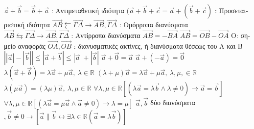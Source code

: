 \documentclass[12pt]{article}
\begin{document}
\begin{flushleft}
	\textbullet \quad $\vec{a} + \vec{b} = \vec{b} + \vec{a} $  :  \textgreek{Αντιμεταθετική ιδιότητα} \linebreak 
	\textbullet \quad $(\vec{a} + \vec{b} + \vec{c} = \vec{a} + (\vec{b} + \vec{c}) $  :  \textgreek{Προσεταιριστική ιδιότητα} \linebreak 
	\textbullet \quad $ \vec{AB} \leftleftarrows \vec{\Gamma \Delta} \rightarrow \vec{AB}, \vec{\Gamma \Delta} $  :  \textgreek{Ομόρροπα διανύσματα} \linebreak  
		\textbullet \quad $ \vec{AB} \leftrightarrows \vec{\Gamma \Delta} \rightarrow \vec{AB}, \vec{\Gamma \Delta} $  :  \textgreek{Αντίρροπα διανύσματα} \linebreak  
	\textbullet \quad $ \vec{AB} = -\vec{BA} $ \linebreak  
	\textbullet \quad $ \vec{AB} = \vec{OB} - \vec{OA} $ \textgreek{Ο: σημείο αναφοράς} \linebreak 
	$\vec{OA}, \vec{OB} $  :  \textgreek{διανυσματικές ακτίνες, ή διανύσματα θέσεως του Α και B} \linebreak 
	\textbullet \quad $ \left| |\vec{a}| - |\vec{b}| \right| \leq |\vec{a} + \vec{b}| \leq |\vec{a}| + |\vec{b}| $ \linebreak 
	\textbullet \quad $ \vec{a} + \vec{0} = \vec{a} $ \linebreak 
	\textbullet \quad $ \vec{a} + (-\vec{a}) = \vec{0} $ \linebreak 
	\textbullet \quad $ \lambda(\vec{a} + \vec{b}) = \lambda \vec{a} + \mu \vec{a} , \ \lambda \in \mathbb{R} $ \linebreak 
	\textbullet \quad $ (\lambda + \mu) \vec{a} = \lambda \vec{a} + \mu \vec{a} , \ \lambda, \mu, \in \mathbb{R} $ \linebreak 
	\textbullet \quad $ \lambda(\mu \vec{a}) = (\lambda \mu) \vec{a} , \ \lambda , \mu \in \mathbb{R} $ \linebreak 
	\textbullet \quad $ \forall \lambda, \mu \in \mathbb{R} \left[(\lambda \vec{a} = \lambda \vec{b} \land \lambda \neq 0 ) \rightarrow \vec{a} = \vec{b} \right] $ \linebreak 
	\textbullet \quad $ \forall \lambda, \mu \in \mathbb{R} \left[ (\lambda \vec{a} = \mu \vec{a} \land \vec{a} \neq 0) \rightarrow \lambda = \mu \right] $ \linebreak 
	\textbullet \quad $ \vec{a}, \vec{b} $ \textgreek{δύο διανύσματα} $, \vec{b} \neq 0 \rightarrow \left[ \vec{a} \parallel \vec{b} \leftrightarrow \exists \lambda \in \mathbb{R} (\vec{a} = \lambda \vec{b} ) \right] $ \linebreak 

\end{flushleft}
\end{document}
